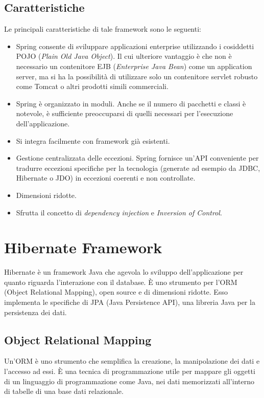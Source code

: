 \subsection{Caratteristiche}
Le principali caratteristiche di tale framework sono le seguenti:
\begin{itemize}
    \item Spring consente di sviluppare applicazioni enterprise utilizzando i cosiddetti POJO (\textit{Plain Old Java Object}). Il cui ulteriore vantaggio è che non è necessario un contenitore EJB (\textit{Enterprise Java Bean}) come un application server, ma si ha la possibilità di utilizzare solo un contenitore servlet robusto come Tomcat o altri prodotti simili commerciali.
    \item Spring è organizzato in moduli. Anche se il numero di pacchetti e classi è notevole, è sufficiente preoccuparsi di quelli necessari per l'esecuzione dell'applicazione.
    \item Si integra facilmente con framework già esistenti.
    \item Gestione centralizzata delle eccezioni. Spring fornisce un'API conveniente per tradurre eccezioni specifiche per la tecnologia (generate ad esempio da JDBC, Hibernate o JDO) in eccezioni coerenti e non controllate.
    \item Dimensioni ridotte.
    \item Sfrutta il concetto di \textit{dependency injection} e \textit{Inversion of Control}.
\end{itemize}

\section{Hibernate Framework} \label{appendix:hibernate}
Hibernate è un framework Java che agevola lo sviluppo dell'applicazione per quanto riguarda l'interazione con il database. È uno strumento per l'ORM (Object Relational Mapping), open source e di dimensioni ridotte. Esso implementa le specifiche di JPA (Java Persistence API), una libreria Java per la persistenza dei dati.

\subsection{Object Relational Mapping}
Un'ORM è uno strumento che semplifica la creazione, la manipolazione dei dati e l'accesso ad essi. È una tecnica di programmazione utile per mappare gli oggetti di un linguaggio di programmazione come Java, nei dati memorizzati all'interno di tabelle di una base dati relazionale.

